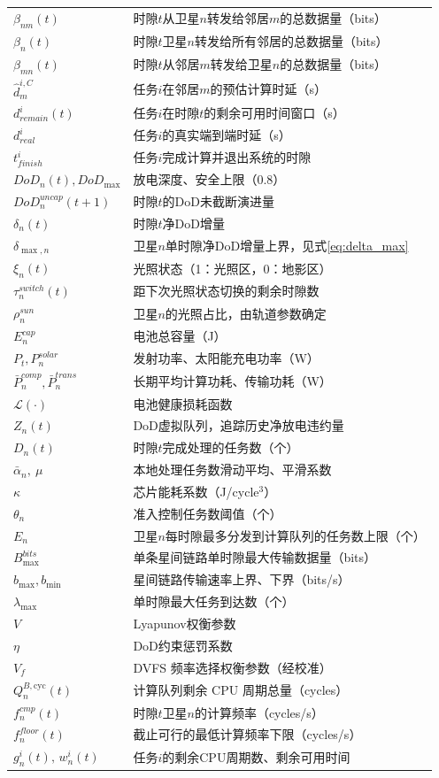 \documentclass[a4paper,11pt]{article}
\begin{document}
\begin{table}[t]
\begin{tabular}{ll}
$\beta_{nm}(t)$ & 时隙$t$从卫星$n$转发给邻居$m$的总数据量（bits） \\
$\beta_n(t)$ & 时隙$t$卫星$n$转发给所有邻居的总数据量（bits） \\
$\beta_{mn}(t)$ & 时隙$t$从邻居$m$转发给卫星$n$的总数据量（bits） \\
$\hat{d}^{i,C}_m$ & 任务$i$在邻居$m$的预估计算时延（s） \\
$d^i_{remain}(t)$ & 任务$i$在时隙$t$的剩余可用时间窗口（s） \\
$d^i_{real}$ & 任务$i$的真实端到端时延（s） \\
$t^i_{finish}$ & 任务$i$完成计算并退出系统的时隙 \\
$DoD_n(t), DoD_{\max}$ & 放电深度、安全上限（0.8） \\
$DoD^{uncap}_n(t+1)$ & 时隙$t$的DoD未截断演进量 \\
$\delta_n(t)$ & 时隙$t$净DoD增量 \\
$\delta_{\max,n}$ & 卫星$n$单时隙净DoD增量上界，见式\eqref{eq:delta_max} \\
$\xi_n(t)$ & 光照状态（1：光照区，0：地影区） \\
$\tau^{switch}_n(t)$ & 距下次光照状态切换的剩余时隙数 \\
$\rho^{sun}_n$ & 卫星$n$的光照占比，由轨道参数确定 \\
$E^{cap}_n$ & 电池总容量（J） \\
$P_t, P^{solar}_n$ & 发射功率、太阳能充电功率（W） \\
$\bar{P}^{comp}_n, \bar{P}^{trans}_n$ & 长期平均计算功耗、传输功耗（W） \\
$\mathcal{L}(\cdot)$ & 电池健康损耗函数 \\
$Z_n(t)$ & DoD虚拟队列，追踪历史净放电违约量 \\
$D_n(t)$ & 时隙$t$完成处理的任务数（个） \\
$\bar{\alpha}_n,~\mu$ & 本地处理任务数滑动平均、平滑系数 \\
$\kappa$ & 芯片能耗系数（J/cycle$^3$） \\
$\theta_n$ & 准入控制任务数阈值（个） \\
$E_n$ & 卫星$n$每时隙最多分发到计算队列的任务数上限（个） \\
$B^{bits}_{\max}$ & 单条星间链路单时隙最大传输数据量（bits） \\
$b_{\max}, b_{\min}$ & 星间链路传输速率上界、下界（bits/s） \\
$\lambda_{\max}$ & 单时隙最大任务到达数（个） \\
$V$ & Lyapunov权衡参数 \\
$\eta$ & DoD约束惩罚系数 \\
$V_f$ & DVFS 频率选择权衡参数（经校准） \\
$Q^{B,\mathrm{cyc}}_n(t)$ & 计算队列剩余 CPU 周期总量（cycles） \\
$f^{cmp}_n(t)$ & 时隙$t$卫星$n$的计算频率（cycles/s） \\
$f^{floor}_n(t)$ & 截止可行的最低计算频率下限（cycles/s） \\
$g^i_n(t),\,w^i_n(t)$ & 任务$i$的剩余CPU周期数、剩余可用时间 \\
\bottomrule
\end{tabular}
\end{table}
\end{document}
